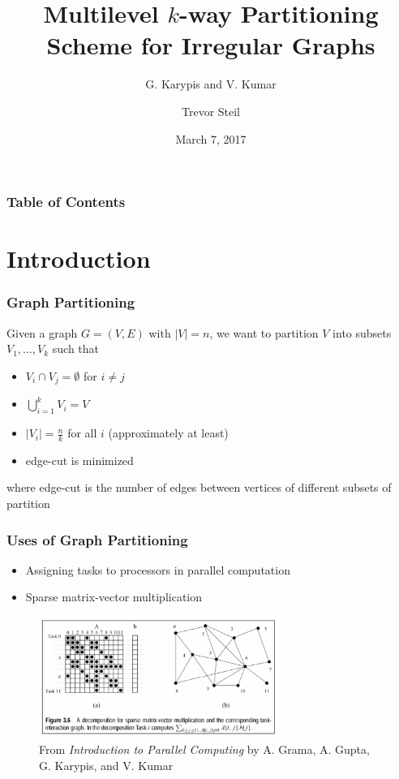 \documentclass{beamer}
\title{Multilevel $k$-way Partitioning Scheme for Irregular Graphs}
\subtitle{G. Karypis and V. Kumar}
\institute{University of Minnesota}
\date{March 7, 2017}
\author{Trevor Steil}
\begin{document}
\begin{frame}
  \titlepage
\end{frame}

\begin{frame}
  \frametitle{Table of Contents}
  \tableofcontents
\end{frame}

\section{Introduction}
\begin{frame}
  \frametitle{Graph Partitioning}

  Given a graph $G = (V, E)$ with $|V|=n$, we want to partition $V$ into subsets $V_1, \dots, V_k$ such that
  \begin{itemize}
    \item $V_i \cap V_j = \emptyset$ for $i \neq j$
    \item $\bigcup_{i=1}^k V_i = V$
    \item $|V_i| = \frac{n}{k}$ for all $i$ (approximately at least)
    \item edge-cut is minimized
  \end{itemize}
  where edge-cut is the number of edges between vertices of different subsets of partition
\end{frame}

\begin{frame}
  \frametitle{Uses of Graph Partitioning}

  \begin{itemize}
    \item Assigning tasks to processors in parallel computation
    \item Sparse matrix-vector multiplication
  \end{itemize}

  \begin{figure}
    \centering
    \includegraphics[width=0.7\textwidth]{./sparse.png}
    \caption*{From \textit{Introduction to Parallel Computing} by A. Grama, A. Gupta, G. Karypis, and V. Kumar}
  \end{figure}
\end{frame}
\end{document}

